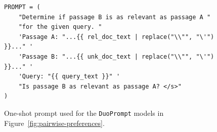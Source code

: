 \begin{figure}[t]
    \centering
    \begin{tcolorbox}[title=One-Shot Prompt, width=\textwidth]
        \footnotesize
        \begin{verbatim}
PROMPT = (
    "Determine if passage B is as relevant as passage A "
    "for the given query. "
    'Passage A: "...{{ rel_doc_text | replace("\\"", "\'") }}..." '
    'Passage B: "...{{ unk_doc_text | replace("\\"", "\'") }}..." '
    'Query: "{{ query_text }}" '
    "Is passage B as relevant as passage A? </s>"
)
        \end{verbatim}
    \end{tcolorbox}
    \caption{One-shot prompt used for the \texttt{DuoPrompt} models in Figure~\ref{fig:pairwise-preferences}.}
    \label{fig:oneshot-prompt}
\end{figure}

